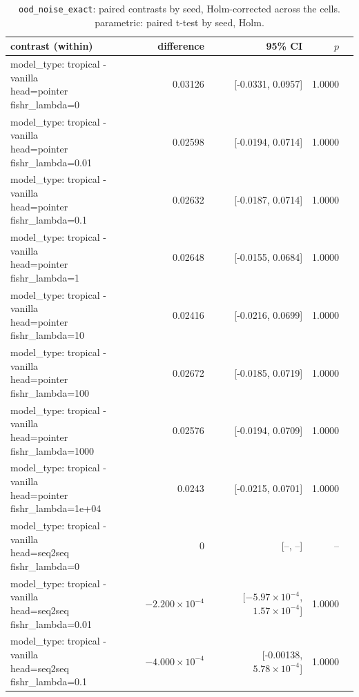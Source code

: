 \documentclass[10pt]{article}
\makeatletter
\newcommand{\stackcell}[1]{\begin{tabular}[t]{@{}l@{}}#1\end{tabular}}
\makeatother
\begin{document}
{\small
\begin{longtable}{lrrrl}
\caption{\texttt{ood\_noise\_exact}: paired contrasts by seed, Holm-corrected across the cells. parametric: paired t-test by seed, Holm.}\label{tab:paired-ood_noise_exact}\\
\toprule
contrast (within) & difference & 95\% CI & $p$ & \\
\midrule
\endhead
\stackcell{model\_type: tropical - vanilla\\\footnotesize head=pointer fishr\_lambda=0 } & 0.03126 & [-0.0331, 0.0957] & 1.0000 & \\
\stackcell{model\_type: tropical - vanilla\\\footnotesize head=pointer fishr\_lambda=0.01 } & 0.02598 & [-0.0194, 0.0714] & 1.0000 & \\
\stackcell{model\_type: tropical - vanilla\\\footnotesize head=pointer fishr\_lambda=0.1 } & 0.02632 & [-0.0187, 0.0714] & 1.0000 & \\
\stackcell{model\_type: tropical - vanilla\\\footnotesize head=pointer fishr\_lambda=1 } & 0.02648 & [-0.0155, 0.0684] & 1.0000 & \\
\stackcell{model\_type: tropical - vanilla\\\footnotesize head=pointer fishr\_lambda=10 } & 0.02416 & [-0.0216, 0.0699] & 1.0000 & \\
\stackcell{model\_type: tropical - vanilla\\\footnotesize head=pointer fishr\_lambda=100 } & 0.02672 & [-0.0185, 0.0719] & 1.0000 & \\
\stackcell{model\_type: tropical - vanilla\\\footnotesize head=pointer fishr\_lambda=1000 } & 0.02576 & [-0.0194, 0.0709] & 1.0000 & \\
\stackcell{model\_type: tropical - vanilla\\\footnotesize head=pointer fishr\_lambda=1e+04 } & 0.0243 & [-0.0215, 0.0701] & 1.0000 & \\
\stackcell{model\_type: tropical - vanilla\\\footnotesize head=seq2seq fishr\_lambda=0 } & 0 & [--, --] & -- & \\
\stackcell{model\_type: tropical - vanilla\\\footnotesize head=seq2seq fishr\_lambda=0.01 } & $-2.200\times10^{-4}$ & [$-5.97\times10^{-4}$, $1.57\times10^{-4}$] & 1.0000 & \\
\stackcell{model\_type: tropical - vanilla\\\footnotesize head=seq2seq fishr\_lambda=0.1 } & $-4.000\times10^{-4}$ & [-0.00138, $5.78\times10^{-4}$] & 1.0000 & \\

\end{longtable}}
\end{document}
